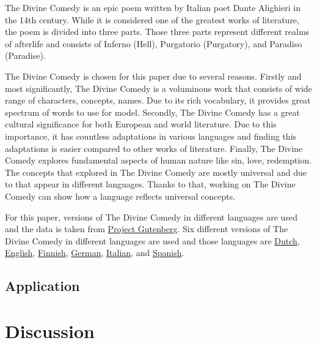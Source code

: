 \documentclass[man]{apa7}
\begin{document}
The Divine Comedy is an epic poem written by Italian poet Dante Alighieri in the 14th century. While it is considered one of the greatest works of literature, the poem is divided into three parts. Those three parts represent different realms of afterlife and consists of Inferno (Hell), Purgatorio (Purgatory), and Paradiso (Paradise).

The Divine Comedy is chosen for this paper due to several reasons. Firstly and most significantly, The Divine Comedy is a voluminous work that consists of wide range of characters, concepts, names. Due to its rich vocabulary, it provides great spectrum of words to use for model. Secondly, The Divine Comedy has a great cultural significance for both European and world literature. Due to this importance, it has countless adaptations in various languages and finding this adaptations is easier compared to other works of literature. Finally, The Divine Comedy explores fundamental aspects of human nature like sin, love, redemption. The concepts that explored in The Divine Comedy are mostly universal and due to that appear in different languages. Thanks to that, working on The Divine Comedy can show how a language reflects universal concepts.

For this paper, versions of The Divine Comedy in different languages are used and the data is taken from \href{https://www.gutenberg.org/}{Project Gutenberg}. Six different versions of The Divine Comedy in different languages are used and those languages are \href{https://www.gutenberg.org/cache/epub/39181/pg39181-images.html}{Dutch}, \href{https://www.gutenberg.org/cache/epub/1004/pg1004-images.html}{English}, \href{https://www.gutenberg.org/cache/epub/12546/pg12546.html}{Finnish}, \href{https://www.gutenberg.org/cache/epub/8085/pg8085.html}{German}, \href{https://www.gutenberg.org/cache/epub/1000/pg1000-images.html}{Italian}, and \href{https://www.gutenberg.org/cache/epub/57303/pg57303-images.html}{Spanish}.

\subsection{Application}


\section{Discussion}
\end{document}
